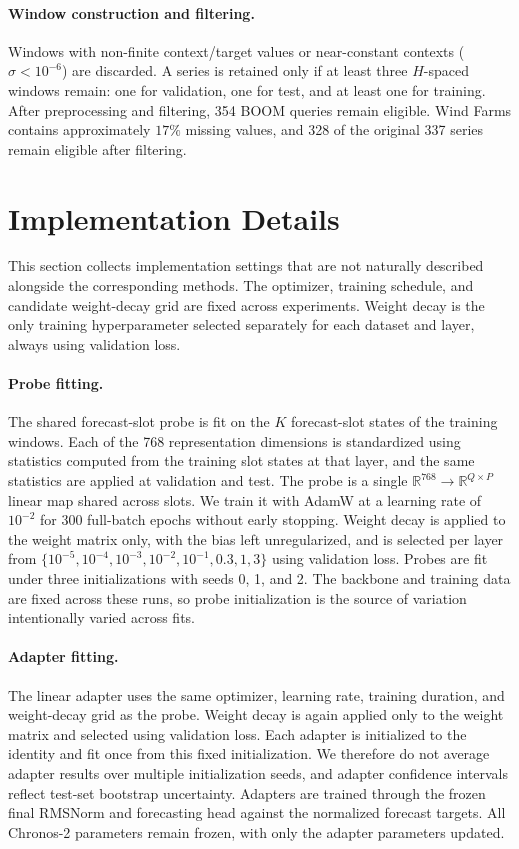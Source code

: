 \documentclass{article}
\begin{document}
\paragraph{Window construction and filtering.}
Windows with non-finite context/target values or near-constant contexts (\(\sigma<10^{-6}\)) are discarded. A series is retained only if at least three \(H\)-spaced windows remain: one for validation, one for test, and at least one for training. After preprocessing and filtering, 354 BOOM queries remain eligible. Wind Farms contains approximately \(17\%\) missing values, and 328 of the original 337 series remain eligible after filtering.

\section{Implementation Details}
\label{app:implementation}

This section collects implementation settings that are not naturally described alongside the corresponding methods. The optimizer, training schedule, and candidate weight-decay grid are fixed across experiments. Weight decay is the only training hyperparameter selected separately for each dataset and layer, always using validation loss.

\paragraph{Probe fitting.}
The shared forecast-slot probe is fit on the \(K\) forecast-slot states of the training windows. Each of the 768 representation dimensions is standardized using statistics computed from the training slot states at that layer, and the same statistics are applied at validation and test. The probe is a single
\(\mathbb{R}^{768} \rightarrow \mathbb{R}^{Q \times P}\) linear map shared across slots. We train it with AdamW at a learning rate of \(10^{-2}\) for 300 full-batch epochs without early stopping. Weight decay is applied to the weight matrix only, with the bias left unregularized, and is selected per layer from
\(\{10^{-5},10^{-4},10^{-3},10^{-2},10^{-1},0.3,1,3\}\)
using validation loss. Probes are fit under three initializations with seeds 0, 1, and 2. The backbone and training data are fixed across these runs, so probe initialization is the source of variation intentionally varied across fits.

\paragraph{Adapter fitting.}
The linear adapter uses the same optimizer, learning rate, training duration, and weight-decay grid as the probe. Weight decay is again applied only to the weight matrix and selected using validation loss. Each adapter is initialized to the identity and fit once from this fixed initialization. We therefore do not average adapter results over multiple initialization seeds, and adapter confidence intervals reflect test-set bootstrap uncertainty. Adapters are trained through the frozen final RMSNorm and forecasting head against the normalized forecast targets. All Chronos-2 parameters remain frozen, with only the adapter parameters updated.
\end{document}
